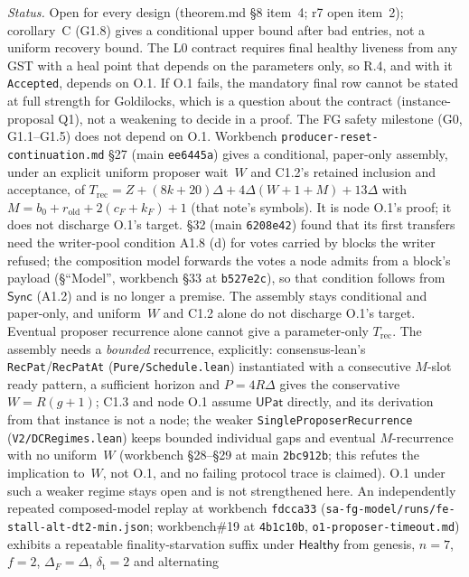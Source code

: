 \documentclass{article}
\newcommand{\cF}{c_F}
\begin{document}
\emph{Status.}  Open for every design (theorem.md \S8 item~4; r7 open item~2);
corollary~C (G1.8) gives a conditional upper bound after bad entries, not a
uniform recovery bound.  The L0 contract requires final healthy liveness
from any GST with a heal point that depends on the parameters only, so R.4,
and with it \texttt{Accepted}, depends on O.1.  If O.1 fails, the
mandatory final row cannot be stated at full strength for Goldilocks, which
is a question about the contract (instance-proposal Q1), not a weakening to
decide in a proof.  The FG safety milestone (G0, G1.1--G1.5) does not
depend on O.1.  Workbench \texttt{producer-reset-continuation.md} \S27 (main \texttt{ee6445a})
gives a conditional, paper-only assembly, under an explicit uniform proposer
wait~$W$ and C1.2's retained inclusion and acceptance, of
$T_{\mathrm{rec}}=Z+(8k+20)\Delta+4\Delta(W+1+M)+13\Delta$ with
$M=b_0+r_{\mathrm{old}}+2(\cF+k_F)+1$ (that note's symbols).  It is node O.1's
proof; it does not discharge O.1's target.  \S32 (main \texttt{6208e42}) found that its first transfers
need the writer-pool condition A1.8 (d) for votes carried by blocks the writer
refused; the composition model forwards the votes a node admits from a
block's payload (\S``Model'', workbench \S33 at \texttt{b527e2c}), so that
condition follows from $\mathsf{Sync}$ (A1.2) and is no longer a premise.  The
assembly stays conditional and paper-only, and uniform~$W$ and C1.2 alone do
not discharge O.1's target.  Eventual proposer
recurrence alone cannot give a parameter-only $T_{\mathrm{rec}}$.  The
assembly needs a \emph{bounded} recurrence, explicitly: consensus-lean's
\texttt{RecPat}/\texttt{RecPatAt} (\texttt{Pure/Schedule.lean}) instantiated
with a consecutive $M$-slot ready pattern, a sufficient horizon and
$P=4R\Delta$ gives the conservative $W=R(g+1)$; C1.3 and node O.1 assume
$\mathsf{UPat}$ directly, and its derivation from that instance is not a node; the weaker \texttt{SingleProposerRecurrence}
(\texttt{V2/DCRegimes.lean}) keeps bounded individual gaps and eventual
$M$-recurrence with no uniform~$W$ (workbench \S28--\S29 at main
\texttt{2bc912b}; this refutes the implication to~$W$, not O.1, and no failing
protocol trace is claimed).  O.1 under such a weaker regime stays open and is
not strengthened here.  An independently repeated composed-model replay at
workbench \texttt{fdcca33} (\texttt{sa-fg-model/runs/fe-stall-alt-dt2-min.json};
workbench\#19 at \texttt{4b1c10b}, \texttt{o1-proposer-timeout.md}) exhibits a
repeatable finality-starvation suffix under $\mathsf{Healthy}$ from genesis,
$n=7$, $f=2$, $\Delta_F=\Delta$, $\delta_{\mathrm t}=2$ and alternating
\end{document}
